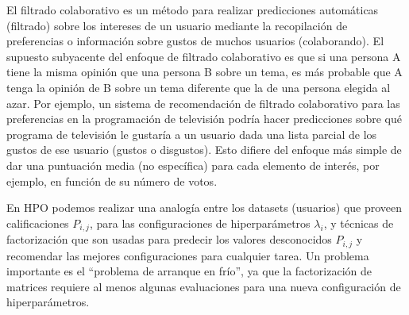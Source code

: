 
El filtrado colaborativo es un método para realizar predicciones automáticas (filtrado) sobre los intereses de un usuario mediante la recopilación de preferencias o información sobre gustos de muchos usuarios (colaborando). El supuesto subyacente del enfoque de filtrado colaborativo es que si una persona A tiene la misma opinión que una persona B sobre un tema, es más probable que A tenga la opinión de B sobre un tema diferente que la de una persona elegida al azar. Por ejemplo, un sistema de recomendación de filtrado colaborativo para las preferencias en la programación de televisión podría hacer predicciones sobre qué programa de televisión le gustaría a un usuario dada una lista parcial de los gustos de ese usuario (gustos o disgustos). Esto difiere del enfoque más simple de dar una puntuación media (no específica) para cada elemento de interés, por ejemplo, en función de su número de votos.

En HPO podemos realizar una analogía entre los datasets (usuarios) que proveen calificaciones $P_{i,j}$, para las configuraciones de hiperparámetros $\lambda_i$, y técnicas de factorización que son usadas para predecir los valores desconocidos $P_{i,j}$ y recomendar las mejores configuraciones para cualquier tarea. Un problema importante es el ``problema de arranque en frío'', ya que la factorización de matrices requiere al menos algunas evaluaciones para una nueva configuración de hiperparámetros.

